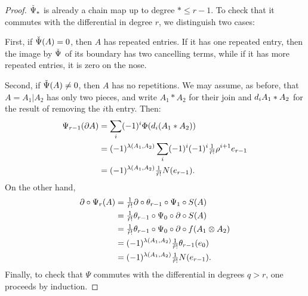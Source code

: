 \begin{proof}
	$\operatorname{\check{\Psi}}_*$ is already a chain map up to degree $*\leq r-1$. To check that it commutes with the differential in degree $r$, we distinguish two cases:

	First, if $\operatorname{\check{\Psi}}(A) = 0$, then $A$ has repeated entries. If it has one repeated entry, then the image by $\operatorname{\check{\Psi}}$ of its boundary has two cancelling terms, while if it has more repeated entries, it is zero on the nose.

	Second, if $\operatorname{\check{\Psi}}(A)\neq 0$, then $A$ has no repetitions. We may assume, as before, that $A = A_1|A_2$ has only two pieces, and write $A_1*A_2$ for their join and $d_iA_1*A_2$ for the result of removing the $i$th entry. Then:
	\begin{align*}
		\Psi_{r-1}(\partial A)
		&= \sum_i (-1)^i \Phi(d_i(A_1*A_2))
		\\
		&= (-1)^{\lambda(A_1,A_2)}\sum_i (-1)^i(-1)^{i}{\textstyle\frac{1}{\tilde{r}!}}\rho^{i+1} e_{r-1}
		\\
		&= (-1)^{\lambda(A_1,A_2)} {\textstyle\frac{1}{\tilde{r}!}} N(e_{r-1}).
	\end{align*}
	On the other hand,
	\begin{align*}
		\partial \circ \Psi_r(A) &= {\textstyle\frac{1}{\tilde{r}!}}\partial \circ \theta_{r-1}\circ \Psi_1\circ S(A)
		\\
		&= {\textstyle\frac{1}{\tilde{r}!}}\theta_{r-1}\circ \Psi_0\circ \partial\circ S(A)
		\\
		&= {\textstyle\frac{1}{\tilde{r}!}}\theta_{r-1}\circ \Psi_0\circ \partial\circ f(A_1 \otimes A_2)
		\\
		&= (-1)^{\lambda(A_1,A_2)}{\textstyle\frac{1}{\tilde{r}!}} \theta_{r-1}(e_0)
		\\
		&= (-1)^{\lambda(A_1,A_2)}{\textstyle\frac{1}{\tilde{r}!}} N(e_{r-1}).
	\end{align*}
	Finally, to check that $\Psi$ commutes with the differential in degrees $q>r$, one proceeds by induction.
\end{proof}

